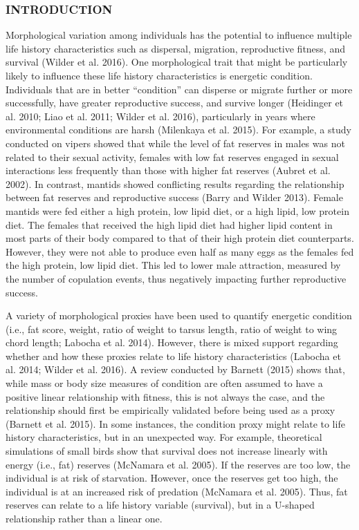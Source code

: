 \documentclass[
]{article}
\begin{document}
\hypertarget{introduction}{%
\subsubsection{INTRODUCTION}\label{introduction}}

Morphological variation among individuals has the potential to influence
multiple life history characteristics such as dispersal, migration,
reproductive fitness, and survival (Wilder et al. 2016). One
morphological trait that might be particularly likely to influence these
life history characteristics is energetic condition. Individuals that
are in better ``condition'' can disperse or migrate further or more
successfully, have greater reproductive success, and survive longer
(Heidinger et al. 2010; Liao et al. 2011; Wilder et al. 2016),
particularly in years where environmental conditions are harsh
(Milenkaya et al. 2015). For example, a study conducted on vipers showed
that while the level of fat reserves in males was not related to their
sexual activity, females with low fat reserves engaged in sexual
interactions less frequently than those with higher fat reserves (Aubret
et al. 2002). In contrast, mantids showed conflicting results regarding
the relationship between fat reserves and reproductive success (Barry
and Wilder 2013). Female mantids were fed either a high protein, low
lipid diet, or a high lipid, low protein diet. The females that received
the high lipid diet had higher lipid content in most parts of their body
compared to that of their high protein diet counterparts. However, they
were not able to produce even half as many eggs as the females fed the
high protein, low lipid diet. This led to lower male attraction,
measured by the number of copulation events, thus negatively impacting
further reproductive success.

A variety of morphological proxies have been used to quantify energetic
condition (i.e., fat score, weight, ratio of weight to tarsus length,
ratio of weight to wing chord length; Labocha et al. 2014). However,
there is mixed support regarding whether and how these proxies relate to
life history characteristics (Labocha et al. 2014; Wilder et al. 2016).
A review conducted by Barnett (2015) shows that, while mass or body size
measures of condition are often assumed to have a positive linear
relationship with fitness, this is not always the case, and the
relationship should first be empirically validated before being used as
a proxy (Barnett et al. 2015). In some instances, the condition proxy
might relate to life history characteristics, but in an unexpected way.
For example, theoretical simulations of small birds show that survival
does not increase linearly with energy (i.e., fat) reserves (McNamara et
al. 2005). If the reserves are too low, the individual is at risk of
starvation. However, once the reserves get too high, the individual is
at an increased risk of predation (McNamara et al. 2005). Thus, fat
reserves can relate to a life history variable (survival), but in a
U-shaped relationship rather than a linear one.
\end{document}
